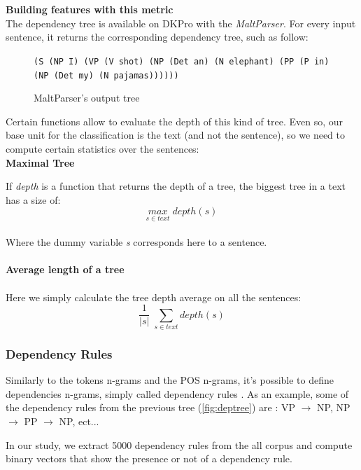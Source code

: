 \
\\
\\
\textbf{Building features with this metric}
\\
The dependency tree is available on DKPro with the \emph{MaltParser}\cite{Nivre_aquick}. For every input sentence, it returns the corresponding dependency tree, such as follow: 
\begin{figure}[h]
\begin{center}
\texttt{(S (NP I) (VP (V shot) (NP (Det an) (N elephant) (PP (P in) (NP (Det my) (N pajamas))))))}
\caption{\label{dkprotree} MaltParser's output tree}
\end{center}
\end{figure}
Certain functions allow to evaluate the depth of this kind of tree. Even so, our base unit for the classification is the text (and not the sentence), so we need to compute certain statistics over the sentences:
\\
\textbf{Maximal Tree}

If \emph{depth} is a function that returns the depth of a tree, the biggest tree in a text has a size of:
\begin{equation*}
\underset{s \in text}{max} \; depth(s)
\end{equation*}
\\
Where the dummy variable \emph{s} corresponds here to a sentence.
\\
\\
\textbf{Average length of a tree}
\\
\\
Here we simply calculate the tree depth average on all the sentences:
\begin{equation*}
\frac{1}{|s|} \; \displaystyle\sum_{s \in text} depth(s)
\end{equation*}

\subsubsection{Dependency Rules}
Similarly to the tokens n-grams and the POS n-grams, it's possible to define dependencies n-grams, simply called dependency rules \cite{TUD-CS-2014-0882}. As an example, some of the dependency rules from the previous tree (\cref{fig:deptree}) are : VP $\rightarrow$ NP, NP $\rightarrow$ PP $\rightarrow$ NP, ect...

In our study, we extract 5000 dependency rules from the all corpus and compute binary vectors that show the presence or not of a dependency rule.


